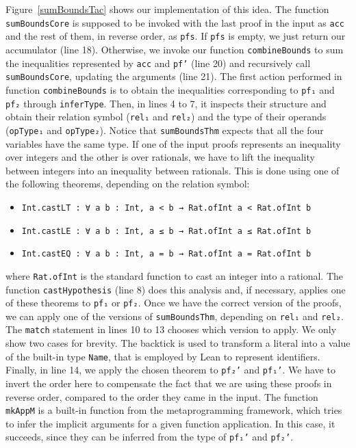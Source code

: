 Figure~\ref{sumBoundsTac} shows our implementation of this idea. The function
\texttt{sumBoundsCore} is supposed to be invoked with the last proof in the input
as \texttt{acc} and the rest of them, in reverse order, as \texttt{pfs}.
If \texttt{pfs} is empty, we just return our accumulator (line 18). Otherwise, we
invoke our function \texttt{combineBounds} to sum the inequalities represented
by \texttt{acc} and \texttt{pf'} (line 20) and recursively call \texttt{sumBoundsCore},
updating the arguments (line 21). The first action performed in function \texttt{combineBounds} is to obtain the inequalities corresponding to \texttt{pf₁} and
\texttt{pf₂} through \texttt{inferType}. Then, in lines 4 to 7, it inspects their structure and
obtain their relation symbol (\texttt{rel₁} and \texttt{rel₂}) and the type of their
operands (\texttt{opType₁} and \texttt{opType₂}). Notice that \texttt{sumBoundsThm}
expects that all the four variables have the same type. If one of the input proofs
represents an inequality over integers and the other is over rationals, we
have to lift the inequality between integers into an inequality between rationals.
This is done using one of the following theorems, depending on the relation symbol:

\begin{itemize}
  \item \texttt{Int.castLT : ∀ {a b : Int}, a < b → Rat.ofInt a < Rat.ofInt b}
  \item \texttt{Int.castLE : ∀ {a b : Int}, a ≤ b → Rat.ofInt a ≤ Rat.ofInt b}
  \item \texttt{Int.castEQ : ∀ {a b : Int}, a = b → Rat.ofInt a = Rat.ofInt b}
\end{itemize}
where \texttt{Rat.ofInt} is the standard function to cast an integer into a rational.
The function \texttt{castHypothesis} (line 8) does this analysis and, if necessary,
applies one of these theorems to \texttt{pf₁} or \texttt{pf₂}.
Once we have the correct version of the proofs, we can apply one of the versions of
\texttt{sumBoundsThm}, depending on \texttt{rel₁} and \texttt{rel₂}. The \texttt{match}
statement in lines 10 to 13 chooses which version to apply. We only show two cases
for brevity. The backtick is used to transform a literal into a value of the built-in type
\texttt{Name}, that is employed by Lean to represent identifiers. Finally, in line 14, we apply the
chosen theorem to \texttt{pf₂'} and \texttt{pf₁'}. We have to invert the order here to compensate the fact that we are using these proofs in reverse order, compared to
the order they came in the input. The function \texttt{mkAppM} is a built-in function
from the metaprogramming framework, which tries to infer the implicit arguments for a
given function application. In this case, it succeeds, since they can be inferred
from the type of \texttt{pf₁'} and \texttt{pf₂'}.

